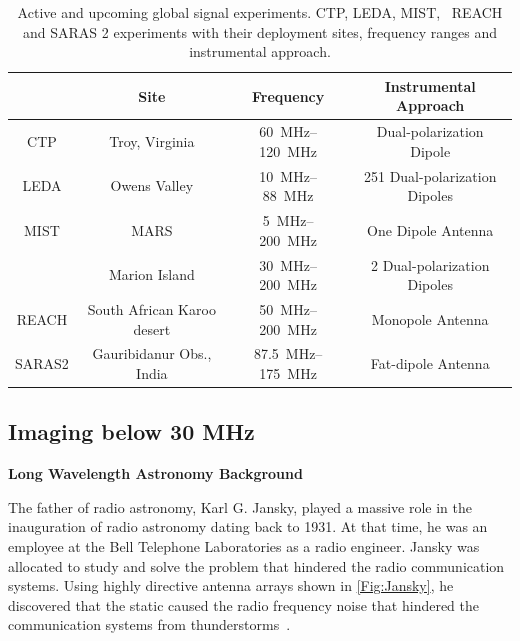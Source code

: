 \begin{table}
	\centering
	\begin{tabular}{ c|ccc} 
		& Site & Frequency & Instrumental Approach \\
		\hline
		CTP & Troy, Virginia & \SIrange{60}{120}{\mega\hertz} & Dual-polarization Dipole \\
		
		LEDA & Owens Valley & \SIrange{10}{88}{\mega\hertz} & 251 Dual-polarization Dipoles \\
		
		MIST & MARS & \SIrange{5}{200}{\mega\hertz} & One Dipole Antenna \\
		\prizm\ & Marion Island & \SIrange{30}{200}{\mega\hertz} & 2 Dual-polarization Dipoles \\
		REACH & South African Karoo desert & \SIrange{50}{200}{\mega\hertz} & Monopole Antenna \\
		SARAS2 & Gauribidanur Obs., India & \SIrange{87.5}{175}{\mega\hertz} & Fat-dipole Antenna \\
		\hline
	\end{tabular}
	\caption{Active and upcoming global signal experiments. CTP, LEDA, MIST, \prizm\, REACH and SARAS 2 experiments with their deployment sites, frequency ranges and instrumental approach.}
	\label{Tab:CD}
\end{table}  

\subsection{Imaging below 30 MHz}

{\bf{Long Wavelength Astronomy Background}}

The father of radio astronomy, Karl G. Jansky, played a massive role in the inauguration of radio astronomy dating back to 1931. At that time, he was an employee at the Bell Telephone Laboratories as a radio engineer. Jansky was allocated to study and solve the problem that hindered the radio communication systems. Using highly directive antenna arrays shown in \autoref{Fig:Jansky}, he discovered that the static caused the radio frequency noise that hindered the communication systems from thunderstorms~\citep{book:BasicsofRA, book:RA}.

